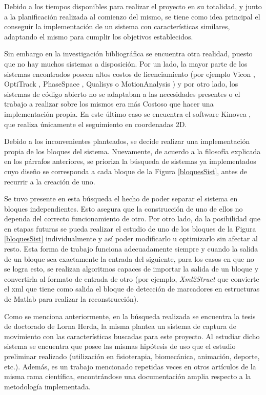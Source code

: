 Debido a los tiempos disponibles para realizar el proyecto en su totalidad, y junto a la planificación realizada al comienzo del mismo, se tiene como idea principal el conseguir la implementación de un sistema con características similares, adaptando el mismo para cumplir los objetivos establecidos. 

Sin embargo en la investigación bibliográfica se encuentra otra realidad, puesto que no hay muchos sistemas a disposición. Por un lado, la mayor parte de los sistemas encontrados poseen altos costos de licenciamiento (por ejemplo Vicon \cite{vicon}, OptiTrack \cite{optitrack}, PhaseSpace \cite{phasespace}, Qualisys \cite{qualisys} o MotionAnalysis \cite{motion_analysis}) y por otro lado, los sistemas de código abierto no se adaptaban a las necesidades presentes o el trabajo a realizar sobre los mismos era más Costoso que hacer una implementación propia. En este último caso se encuentra el software Kinovea \cite{kinovea}, que realiza únicamente el seguimiento en coordenadas 2D.

Debido a los inconvenientes planteados, se decide realizar una implementación propia de los bloques del sistema. Nuevamente, de acuerdo a la filosofía explicada en los párrafos anteriores, se prioriza la búsqueda de sistemas ya implementados cuyo diseño se corresponda a cada bloque de la Figura \ref{bloquesSist},  antes de recurrir a la creación de uno.

Se tuvo presente en esta búsqueda el hecho de poder separar el sistema en bloques independientes. Esto asegura que la construcción de uno de ellos no dependa del correcto funcionamiento de otro. Por otro lado, da la posibilidad que en etapas futuras se pueda realizar el estudio de uno de los bloques de la Figura \ref{bloquesSist} individualmente y así poder modificarlo u optimizarlo sin afectar al resto. Esta forma de trabajo funciona adecuadamente siempre y cuando la salida de un bloque sea exactamente la entrada del siguiente, para los casos en que no se logra esto, se realizan algoritmos capaces de importar la salida de un bloque y convertirla al formato de entrada de otro (por ejemplo, \textit{Xml2Struct} que convierte el xml que tiene como salida el bloque de detección de marcadores en estructuras de Matlab para realizar la reconstrucción).

Como se menciona anteriormente, en la búsqueda realizada se encuentra la tesis de doctorado de Lorna Herda\cite{herda}, la misma plantea un sistema de captura de movimiento con las características buscadas para este proyecto. Al estudiar dicho sistema se encuentra que posee las mismas hipótesis de uso que el estudio preliminar realizado (utilización en fisioterapia, biomecánica, animación, deporte, etc.). Además, es un trabajo mencionado repetidas veces en otros artículos de la misma rama científica, encontrándose una documentación amplia respecto a la metodología implementada.

